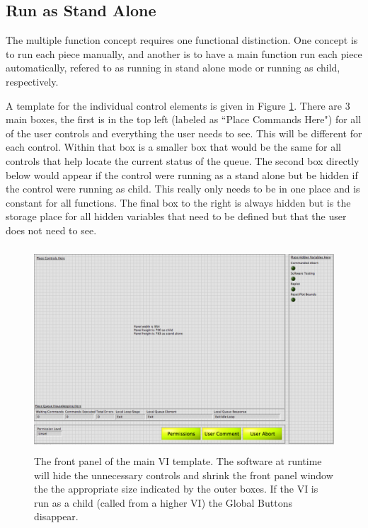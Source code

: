 \subsection{Run as Stand Alone}

The multiple function concept requires one functional distinction. One concept is to run each piece manually, and another is to have a main function run each piece automatically, refered to as running in stand alone mode or running as child, respectively.   

A template for the individual control elements is given in Figure \ref{Fig:VITemplate}. There are 3 main boxes, the first is in the top left (labeled as ``Place Commands Here") for all of the user controls and everything the user needs to see. This will be different for each control. Within that box is a smaller box that would be the same for all controls that help locate the current status of the queue. The second box directly below would appear if the control were running as a stand alone but be hidden if the control were running as child. This really only needs to be in one place and is constant for all functions. The final box to the right is always hidden but is the storage place for all hidden variables that need to be defined but that the user does not need to see. 

\begin{figure}[!h]\centering
\includegraphics[height=3in]{Figures/MainVITemplate}
\caption{The front panel of the main VI template. The software at runtime will hide the unnecessary controls and shrink the front panel window the the appropriate size indicated by the outer boxes. If the VI is run as a child (called from a higher VI) the Global Buttons disappear. }\label{Fig:VITemplate}
\end{figure}

